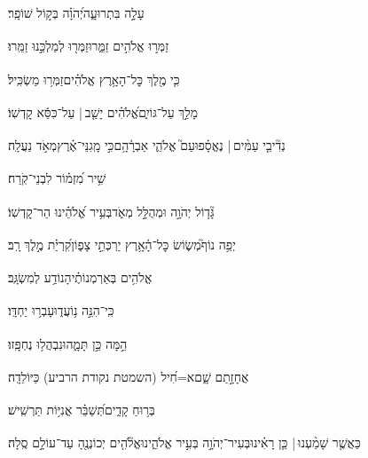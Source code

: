 \documentclass[12pt]{article}
\newcommand{\loc}[1]{\textsuperscript{\locf{#1}}}
\begin{document}
{\loc{ ו}~}‏עָלָ֣ה  בִּתְרוּעָ֑ה{\hfill}יְ֝הֹוָ֗ה בְּק֣וֹל שׁוֹפָֽר׃\par

{\loc{ ז}~}‏זַמְּר֣וּ אֱלֹהִ֣ים זַמֵּ֑רוּ{\hfill}זַמְּר֖וּ לְמַלְכֵּ֣נוּ זַמֵּֽרוּ׃\par

{\loc{ ח}~}‏כִּ֤י מֶ֖לֶךְ כׇּל־הָאָ֥רֶץ אֱלֹהִ֗ים{\hfill}זַמְּר֥וּ מַשְׂכִּֽיל׃\par

{\loc{ ט}~}‏מָלַ֣ךְ  עַל־גּוֹיִ֑ם{\hfill}אֱ֝לֹהִ֗ים יָשַׁ֤ב |  עַל־כִּסֵּ֬א קׇדְשֽׁוֹ׃\par

{\loc{ י}~}‏נְדִ֘יבֵ֤י עַמִּ֨ים |  נֶאֱסָ֗פוּ{\hfill}עַם֮ אֱלֹהֵ֢י אַבְרָ֫הָ֥ם\newline\hspace*{.5em}כִּ֣י  מָֽגִנֵּי־אֶ֗רֶץ{\hfill}מְאֹ֣ד נַעֲלָֽה׃\par\pend
\ledpb
\pstart[\subsection*{\textcolor{red}{פרק מח}}]\label{פרק מח}
{\loc{ א}~}‏שִׁ֥יר מִ֝זְמ֗וֹר לִבְנֵי־קֹֽרַח׃\par

{\loc{ ב}~}‏גָּ֘ד֤וֹל יְהֹוָ֣ה וּמְהֻלָּ֣ל מְאֹ֑ד{\hfill}בְּעִ֥יר אֱ֝לֹהֵ֗ינוּ הַר־קׇדְשֽׁוֹ׃\par

{\loc{ ג}~}‏יְפֵ֥ה נוֹף֮{\hfill}מְשׂ֢וֹשׂ כׇּל־הָ֫אָ֥רֶץ\newline\hspace*{.5em} יַרְכְּתֵ֣י צָפ֑וֹן{\hfill}קִ֝רְיַ֗ת מֶ֣לֶךְ רָֽב׃\par

{\loc{ ד}~}‏אֱלֹהִ֥ים בְּאַרְמְנוֹתֶ֗יהָ{\hfill}נוֹדַ֥ע לְמִשְׂגָּֽב׃\par

{\loc{ ה}~}‏כִּֽי־הִנֵּ֣ה  נ֥וֹעֲד֑וּ{\hfill}עָבְר֥וּ יַחְדָּֽו׃\par

{\loc{ ו}~}‏הֵ֣מָּה  כֵּ֣ן תָּמָ֑הוּ{\hfill}נִבְהֲל֥וּ נֶחְפָּֽזוּ׃\par

{\loc{ ז}~}‏ אֲחָזָ֣תַם שָׁ֑ם{\hfill}א=חִ֝יל (השמטת נקודת הרביע) כַּיּוֹלֵדָֽה׃\par

{\loc{ ח}~}‏בְּר֥וּחַ קָדִ֑ים{\hfill}תְּ֝שַׁבֵּ֗ר אֳנִיּ֥וֹת תַּרְשִֽׁישׁ׃\par

{\loc{ ט}~}‏כַּאֲשֶׁ֤ר שָׁמַ֨עְנוּ |  כֵּ֤ן רָאִ֗ינוּ{\hfill}בְּעִיר־יְהֹוָ֣ה \newline\hspace*{.5em}בְּעִ֣יר אֱלֹהֵ֑ינוּ{\hfill}אֱלֹ֘הִ֤ים יְכוֹנְנֶ֖הָ עַד־עוֹלָ֣ם סֶֽלָה׃\par
\end{document}

